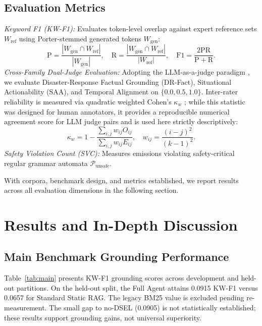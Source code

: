 \documentclass[conference]{IEEEtran}
\begin{document}
\subsection{Evaluation Metrics}
\textit{Keyword F1 (KW-F1):} Evaluates token-level overlap against expert reference sets $W_{\mathrm{ref}}$ using Porter-stemmed generated tokens $W_{\mathrm{gen}}$:
\begin{equation}
\mathrm{P} = \frac{|W_{\mathrm{gen}} \cap W_{\mathrm{ref}}|}{|W_{\mathrm{gen}}|}, \quad
\mathrm{R} = \frac{|W_{\mathrm{gen}} \cap W_{\mathrm{ref}}|}{|W_{\mathrm{ref}}|}, \quad
\mathrm{F1} = \frac{2\mathrm{PR}}{\mathrm{P} + \mathrm{R}}.
\label{eq:f1}
\end{equation}
\textit{Cross-Family Dual-Judge Evaluation:} Adopting the LLM-as-a-judge paradigm \cite{zheng}, we evaluate Disaster-Response Factual Grounding (DR-Fact), Situational Actionability (SAA), and Temporal Alignment on $\{0.0, 0.5, 1.0\}$. Inter-rater reliability is measured via quadratic weighted Cohen's $\kappa_w$ \cite{cohen1968, landis1977}; while this statistic was designed for human annotators, it provides a reproducible numerical agreement score for LLM judge pairs and is used here strictly descriptively:
\begin{equation}
\kappa_w = 1 - \frac{\sum_{i,j} w_{ij} O_{ij}}{\sum_{i,j} w_{ij} E_{ij}}, \quad w_{ij} = \frac{(i - j)^2}{(k - 1)^2}.
\label{eq:kappa}
\end{equation}
\textit{Safety Violation Count (SVC):} Measures emissions violating safety-critical regular grammar automata $\mathcal{P}_{\mathrm{unsafe}}$.

With corpora, benchmark design, and metrics established, we report results across all evaluation dimensions in the following section.

\section{Results and In-Depth Discussion}

\subsection{Main Benchmark Grounding Performance}
Table~\ref{tab:main} presents KW-F1 grounding scores across development and held-out partitions. On the held-out split, the Full Agent attains 0.0915 KW-F1 versus 0.0657 for Standard Static RAG. The legacy BM25 value is excluded pending re-measurement. The small gap to no-DSEL (0.0905) is not statistically established; these results support grounding gains, not universal superiority.
\end{document}
